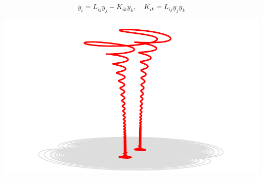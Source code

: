 \topline
\begin{equation*}
  \dot{y_i} = L_{ij} y_j - K_{ik} y_k,
  \quad K_{ik} = L_{ij} y_j y_k
\end{equation*}
\eframe

\topline
\begin{center}
  \includegraphics[width=\textwidth]{i/far.pdf}
\end{center}
\eframe

\topline

